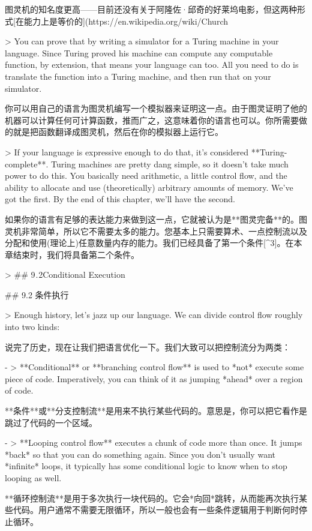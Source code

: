 \documentclass[cn,11pt,chinese]{elegantbook}
\begin{document}
{图灵机的知名度更高——目前还没有关于阿隆佐·邱奇的好莱坞电影，但这两种形式[在能力上是等价的](https://en.wikipedia.org/wiki/Church%

> You can prove that by writing a simulator for a Turing machine in your language. Since Turing proved his machine can compute any computable function, by extension, that means your language can too. All you need to do is translate the function into a Turing machine, and then run that on your simulator.

你可以用自己的语言为图灵机编写一个模拟器来证明这一点。由于图灵证明了他的机器可以计算任何可计算函数，推而广之，这意味着你的语言也可以。你所需要做的就是把函数翻译成图灵机，然后在你的模拟器上运行它。

> If your language is expressive enough to do that, it’s considered **Turing-complete**. Turing machines are pretty dang simple, so it doesn’t take much power to do this. You basically need arithmetic, a little control flow, and the ability to allocate and use (theoretically) arbitrary amounts of memory. We’ve got the first. By the end of this chapter, we’ll have the second.

如果你的语言有足够的表达能力来做到这一点，它就被认为是**图灵完备**的。图灵机非常简单，所以它不需要太多的能力。您基本上只需要算术、一点控制流以及分配和使用(理论上)任意数量内存的能力。我们已经具备了第一个条件[^3]。在本章结束时，我们将具备第二个条件。

> ## 9 . 2Conditional Execution

## 9.2 条件执行

> Enough history, let’s jazz up our language. We can divide control flow roughly into two kinds:

说完了历史，现在让我们把语言优化一下。我们大致可以把控制流分为两类：

- > **Conditional** or **branching control flow** is used to *not* execute some piece of code. Imperatively, you can think of it as jumping *ahead* over a region of code.

  **条件**或**分支控制流**是用来不执行某些代码的。意思是，你可以把它看作是跳过了代码的一个区域。

- > **Looping control flow** executes a chunk of code more than once. It jumps *back* so that you can do something again. Since you don’t usually want *infinite* loops, it typically has some conditional logic to know when to stop looping as well.

  **循环控制流**是用于多次执行一块代码的。它会*向回*跳转，从而能再次执行某些代码。用户通常不需要无限循环，所以一般也会有一些条件逻辑用于判断何时停止循环。

}
\end{document}
